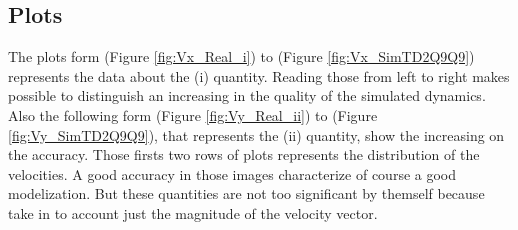 \documentclass[class=article, crop=false]{standalone}
\begin{document}
\subsection{Plots}
The plots form (Figure \ref{fig:Vx_Real_i}) to (Figure \ref{fig:Vx_SimTD2Q9Q9}) represents the data about the (i) quantity.
Reading those from left to right makes possible to distinguish an increasing in the quality of the simulated dynamics.
Also the following form (Figure \ref{fig:Vy_Real_ii}) to (Figure \ref{fig:Vy_SimTD2Q9Q9}), that represents the (ii) quantity, show the increasing on the accuracy.
Those firsts two rows of plots represents the distribution of the velocities.
A good accuracy in those images characterize of course a good modelization.
But these quantities are not too significant by themself because take in to account just the magnitude of the velocity vector.
\end{document}
